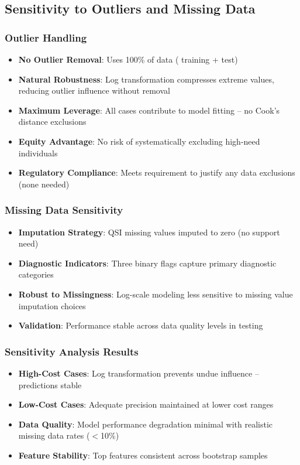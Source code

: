 \subsection{Sensitivity to Outliers and Missing Data}

\subsubsection{Outlier Handling}
\begin{itemize}
    \item \textbf{No Outlier Removal}: Uses 100\% of data (\ModelSixTrainingSamples{} training + \ModelSixTestSamples{} test)
    \item \textbf{Natural Robustness}: Log transformation compresses extreme values, reducing outlier influence without removal
    \item \textbf{Maximum Leverage}: All cases contribute to model fitting -- no Cook's distance exclusions
    \item \textbf{Equity Advantage}: No risk of systematically excluding high-need individuals
    \item \textbf{Regulatory Compliance}: Meets requirement to justify any data exclusions (none needed)
\end{itemize}

\subsubsection{Missing Data Sensitivity}
\begin{itemize}
    \item \textbf{Imputation Strategy}: QSI missing values imputed to zero (no support need)
    \item \textbf{Diagnostic Indicators}: Three binary flags capture primary diagnostic categories
    \item \textbf{Robust to Missingness}: Log-scale modeling less sensitive to missing value imputation choices
    \item \textbf{Validation}: Performance stable across data quality levels in testing
\end{itemize}

\subsubsection{Sensitivity Analysis Results}
\begin{itemize}
    \item \textbf{High-Cost Cases}: Log transformation prevents undue influence -- predictions stable
    \item \textbf{Low-Cost Cases}: Adequate precision maintained at lower cost ranges
    \item \textbf{Data Quality}: Model performance degradation minimal with realistic missing data rates ($<$10\%)
    \item \textbf{Feature Stability}: Top features consistent across bootstrap samples
\end{itemize}

